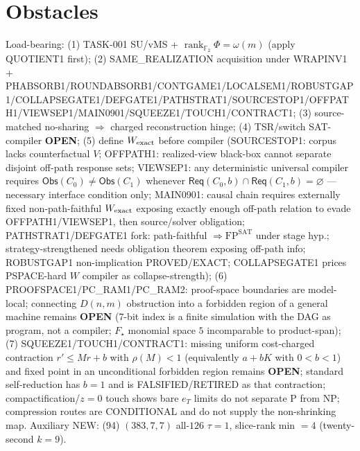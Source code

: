 \documentclass[11pt]{article}
\begin{document}
\section*{Obstacles}
Load-bearing: (1) TASK-001 SU/vMS + $\operatorname{rank}_{\mathbb F_2}\Phi=\omega(m)$ (apply QUOTIENT1 first);
(2) SAME\_REALIZATION acquisition under WRAPINV1 + PHABSORB1/ROUNDABSORB1/CONTGAME1/LOCALSEM1/ROBUSTGAP1/COLLAPSEGATE1/DEFGATE1/PATHSTRAT1/SOURCESTOP1/OFFPATH1/VIEWSEP1/MAIN0901/SQUEEZE1/TOUCH1/CONTRACT1;
(3) source-matched no-sharing $\Rightarrow$ charged reconstruction hinge;
(4) TSR/switch SAT-compiler \textbf{OPEN};
(5) define $W_{\rm exact}$ before compiler (SOURCESTOP1: corpus lacks counterfactual $V$;
OFFPATH1: realized-view black-box cannot separate disjoint off-path response sets;
VIEWSEP1: any deterministic universal compiler requires $\mathsf{Obs}(C_0)\ne\mathsf{Obs}(C_1)$
whenever $\mathsf{Req}(C_0,b)\cap\mathsf{Req}(C_1,b)=\varnothing$ --- necessary interface condition only;
MAIN0901: causal chain requires externally fixed non-path-faithful $W_{\rm exact}$ exposing
exactly enough off-path relation to evade OFFPATH1/VIEWSEP1, then source/solver obligation;
PATHSTRAT1/DEFGATE1 fork: path-faithful $\Rightarrow\mathrm{FP}^{\mathrm{SAT}}$ under stage hyp.;
strategy-strengthened needs obligation theorem exposing off-path info;
ROBUSTGAP1 non-implication PROVED/EXACT; COLLAPSEGATE1 prices PSPACE-hard $W$ compiler as collapse-strength);
(6) PROOFSPACE1/PC\_RAM1/PC\_RAM2: proof-space boundaries are model-local; connecting $D(n,m)$ obstruction into a
forbidden region of a general machine remains \textbf{OPEN} ($7$-bit index is a finite simulation with the DAG as program, not a compiler; $F_\star$ monomial space $5$ incomparable to product-span);
(7) SQUEEZE1/TOUCH1/CONTRACT1: missing uniform cost-charged contraction $r'\le Mr+b$ with $\rho(M){<}1$ (equivalently $a+bK$ with $0{<}b{<}1$) and fixed point in an unconditional forbidden region remains \textbf{OPEN};
standard self-reduction has $b{=}1$ and is FALSIFIED/RETIRED as that contraction; compactification/$z{=}0$ touch shows bare $e_T$ limits do not separate P from NP;
compression routes are CONDITIONAL and do not supply the non-shrinking map.
Auxiliary NEW: (94) $(383,7,7)$ all-$126$ $\tau{=}1$, slice-rank min $=4$ (twenty-second $k{=}9$).
\end{document}
